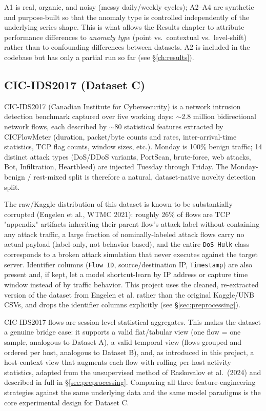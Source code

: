 A1 is real, organic, and noisy (messy daily/weekly cycles); A2--A4 are synthetic and purpose-built so that the anomaly type is controlled independently of the underlying series shape. This is what allows the Results chapter to attribute performance differences to \emph{anomaly type} (point vs.\ contextual vs.\ level-shift) rather than to confounding differences between datasets. A2 is included in the codebase but has only a partial run so far (see \S\ref{ch:results}).

\subsection{CIC-IDS2017 (Dataset C)}

CIC-IDS2017 (Canadian Institute for Cybersecurity) is a network intrusion detection benchmark captured over five working days: $\sim$2.8 million bidirectional network flows, each described by $\sim$80 statistical features extracted by CICFlowMeter (duration, packet/byte counts and rates, inter-arrival-time statistics, TCP flag counts, window sizes, etc.). Monday is 100\% benign traffic; 14 distinct attack types (DoS/DDoS variants, PortScan, brute-force, web attacks, Bot, Infiltration, Heartbleed) are injected Tuesday through Friday. The Monday-benign / rest-mixed split is therefore a natural, dataset-native novelty detection split.

The raw/Kaggle distribution of this dataset is known to be substantially corrupted (Engelen et al., WTMC 2021): roughly 26\% of flows are TCP "appendix" artifacts inheriting their parent flow's attack label without containing any attack traffic, a large fraction of nominally-labeled attack flows carry no actual payload (label-only, not behavior-based), and the entire \texttt{DoS Hulk} class corresponds to a broken attack simulation that never executes against the target server. Identifier columns (\texttt{Flow ID}, source/destination IP, \texttt{Timestamp}) are also present and, if kept, let a model shortcut-learn by IP address or capture time window instead of by traffic behavior. This project uses the cleaned, re-extracted version of the dataset from Engelen et al. rather than the original Kaggle/UNB CSVs, and drops the identifier columns explicitly (see \S\ref{sec:preprocessing}).

CIC-IDS2017 flows are session-level statistical aggregates. This makes the dataset a genuine bridge case: it supports a valid flat/tabular view (one flow = one sample, analogous to Dataset A), a valid temporal view (flows grouped and ordered per host, analogous to Dataset B), and, as introduced in this project, a host-context view that augments each flow with rolling per-host activity statistics, adapted from the unsupervised method of Raskovalov et al.\ (2024) and described in full in \S\ref{sec:preprocessing}. Comparing all three feature-engineering strategies against the same underlying data and the same model paradigms is the core experimental design for Dataset C.

